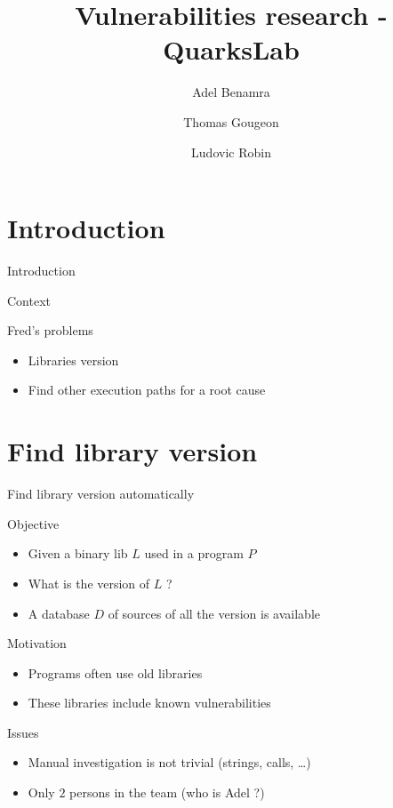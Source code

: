 \documentclass[11pt]{beamer}
\author{Adel Benamra \and Thomas Gougeon \and Ludovic Robin}
\title{Vulnerabilities research - QuarksLab}
\begin{document}
\begin{frame}
\titlepage
\end{frame}

\begin{frame}
\tableofcontents
\end{frame}

\section{Introduction}
\begin{frame}{Introduction}

\begin{block}{Context}


\end{block}

\begin{block}{Fred's problems}

\begin{itemize}
	\item Libraries version
	\item Find other execution paths for a root cause
\end{itemize}

\end{block}

\end{frame}

\section{Find library version}
\begin{frame}{Find library version automatically}

\begin{block}{Objective}
	\begin{itemize}
		\item Given a binary lib $L$ used in a program $P$
		\item What is the version of $L$ ?
		\item A database $D$ of sources of all the version is available
	\end{itemize}
\end{block}

\begin{block}{Motivation}
	\begin{itemize}
		\item Programs often use old libraries
		\item These libraries include known vulnerabilities
	\end{itemize}
\end{block}

\begin{block}{Issues}
	\begin{itemize}
		\item Manual investigation is not trivial (strings, calls, \dots)
		\item Only $2$ persons in the team (who is Adel ?)
	\end{itemize}

\end{block}

\end{frame}
\end{document}
